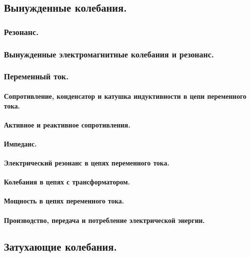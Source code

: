 \documentclass{article}
\begin{document}
    \subsection{Вынужденные колебания.}
        \subsubsection{Резонанс.}
        \subsubsection{Вынужденные электромагнитные колебания и резонанс.}
        \subsubsection{Переменный ток.}
            \paragraph{Сопротивление, конденсатор и катушка индуктивности в цепи переменного тока.}
            \paragraph{Активное и реактивное сопротивления.}
            \paragraph{Импеданс.}
            \paragraph{Электрический резонанс в цепях переменного тока.}
            \paragraph{Колебания в цепях с трансформатором.}
            \paragraph{Мощность в цепях переменного тока.}
            \paragraph{Производство, передача и потребление электрической энергии.}
    \subsection{Затухающие колебания.}
\end{document}
